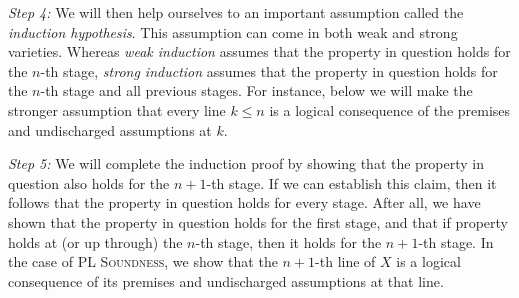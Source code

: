 \textit{Step 4:} 
We will then help ourselves to an important assumption called the \textit{induction hypothesis}.
This assumption can come in both weak and strong varieties.
Whereas \textit{weak induction} assumes that the property in question holds for the $n$-th stage, \textit{strong induction} assumes that the property in question holds for the $n$-th stage and all previous stages.
For instance, below we will make the stronger assumption that every line $k \leq n$ is a logical consequence of the premises and undischarged assumptions at $k$.

\textit{Step 5:} 
We will complete the induction proof by showing that the property in question also holds for the $n+1$-th stage.
If we can establish this claim, then it follows that the property in question holds for every stage.
After all, we have shown that the property in question holds for the first stage, and that if property holds at (or up through) the $n$-th stage, then it holds for the $n+1$-th stage.
In the case of \textsc{PL Soundness}, we show that the $n+1$-th line of $X$ is a logical consequence of its premises and undischarged assumptions at that line. 



